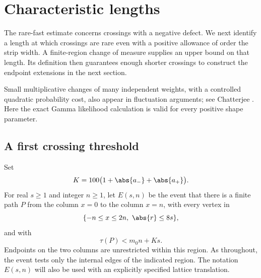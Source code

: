 \section{Characteristic lengths}\label{df:sec:scales}

The rare-fast estimate concerns crossings with a negative defect.
We next identify a length at which crossings are rare even with a
positive allowance of order the strip width. A finite-region change
of measure supplies an upper bound on that length. Its definition
then guarantees enough shorter crossings to construct the endpoint
extensions in the next section.

Small multiplicative changes of many independent weights, with a
controlled quadratic probability cost, also appear in fluctuation
arguments; see Chatterjee \cite{Chatterjee2019}. Here the exact Gamma
likelihood calculation is valid for every positive shape parameter.

\subsection{A first crossing threshold}

Set
\[
 K=100\bigl(1+\abs{a_-}+\abs{a_+}\bigr).
\]
For real $s\geq1$ and integer $n\geq1$, let $E(s,n)$ be the event that
there is a finite path $P$ from the column $x=0$ to the column $x=n$,
with every vertex in
\[
 \{-n\leq x\leq2n,\ \abs{r}\leq8s\},
\]
and with
\[
 \tau(P)<m_0n+Ks.
\]
Endpoints on the two columns are unrestricted within this region. As
throughout, the event tests only the internal edges of the indicated
region. The notation $E(s,n)$ will also be used with an explicitly
specified lattice translation.

